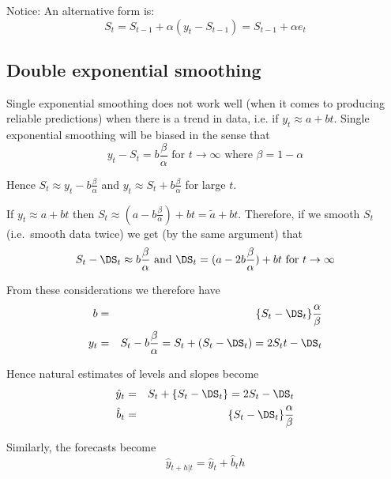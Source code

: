 \documentclass[10pt]{article}\usepackage[]{graphicx}\usepackage[]{color}
\begin{document}
Notice: An alternative form is:
\begin{displaymath}
  S_t = S_{t-1} + \alpha (y_t-S_{t-1}) = S_{t-1} + \alpha e_t
\end{displaymath}



\subsection{Double exponential smoothing}
\label{sec:des}

Single exponential smoothing does not work well (when it comes to producing reliable predictions) when there is a trend
in data, i.e. if $y_t \approx a + b t$.
Single exponential smoothing will be biased in the sense that
\begin{displaymath}
  y_t -S_t = b \frac{\beta}{\alpha} \mbox{ for } t\rightarrow\infty
  \mbox{ where } \beta=1-\alpha
\end{displaymath}

Hence $S_t \approx y_t - b \frac{\beta}{\alpha}$ and $y_t \approx S_t
+ b \frac{\beta}{\alpha}$ for large $t$.

If $y_t \approx a + b t$ then $S_t \approx ( a  - b
\frac{\beta}{\alpha}) + bt = \tilde a + bt$.
Therefore, if we smooth $S_t$ (i.e.\ smooth data twice) we get (by the same
argument) that
\begin{displaymath}
  S_t - \DS_t \approx b \frac{\beta}{\alpha}
\mbox{ and }
  \DS_t = (a - 2b \frac {\beta} \alpha) + bt \mbox{ for } t\rightarrow\infty
\end{displaymath}

From these considerations we therefore have
\begin{eqnarray}
  \label{eq:ses4}
  b &=& \{ S_t-\DS_t\}\frac\alpha\beta  \\
  y_t &=& S_t- b\frac{\beta}{\alpha} = S_t+(S_t-\DS_t)=2S_tt-\DS_t
\end{eqnarray}

Hence natural estimates of levels and slopes become
\begin{eqnarray}
  \label{eq:des6}
    \hat y_t   &=& S_t+\{S_t-\DS_t\}=2S_t-\DS_t\\
    \hat b_t  &=& \{S_t-\DS_t\}\frac \alpha\beta
\end{eqnarray}

Similarly, the forecasts become
\begin{equation}
  \label{eq:des7}
  \hat y_{t+h|t} = \hat y_t + \hat b_t h
\end{equation}
\end{document}
